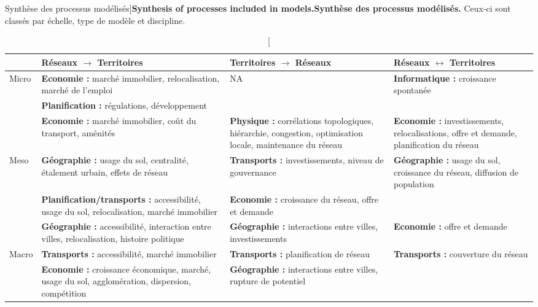 \begin{table}%
\caption[Synthesis of processes included in models][Synthèse des processus modélisés]{\textbf{Synthesis of processes included in models.}\label{tab:modelography:processes}}{\textbf{Synthèse des processus modélisés.} Ceux-ci sont classés par échelle, type de modèle et discipline. \label{tab:modelography:processes}}
\begin{tabular}{|l|p{5cm}|p{5cm}|p{5cm}|}
\hline
 & Réseaux $\rightarrow$ Territoires & Territoires $\rightarrow$ Réseaux & Réseaux $\leftrightarrow$ Territoires\\ \hline
\multirow{2}{*}{Micro} &
\textbf{Economie : } marché immobilier, relocalisation, marché de l'emploi & NA & \textbf{Informatique : } croissance spontanée \\\cline{2-2}
& \textbf{Planification : } régulations, développement & & \\\hline
& \textbf{Economie : } marché immobilier, coût du transport, aménités & \textbf{Physique : } corrélations topologiques, hiérarchie, congestion, optimisation locale, maintenance du réseau & \textbf{Economie : } investissements, relocalisations, offre et demande, planification du réseau\\\cline{2-4}
\multirow{2}{*}{Meso}& \textbf{Géographie : } usage du sol, centralité, étalement urbain, effets de réseau & \textbf{Transports : } investissements, niveau de gouvernance & \textbf{Géographie : } usage du sol, croissance du réseau, diffusion de population \\\cline{2-3}
& \textbf{Planification/transports : } accessibilité, usage du sol, relocalisation, marché immobilier & \textbf{Economie : } croissance du réseau, offre et demande & \\\hline
& \textbf{Géographie : } accessibilité, interaction entre villes, relocalisation, histoire politique  & \textbf{Géographie : } interactions entre villes, investissements & \textbf{Economie : } offre et demande \\ \cline{2-4}
\multirow{2}{*}{Macro} & \textbf{Transports : } accessibilité, marché immobilier & \textbf{Transports : } planification de réseau & \textbf{Transports : } couverture du réseau \\\cline{2-3}
& \textbf{Economie : } croissance économique, marché, usage du sol, agglomération, dispersion, compétition & \textbf{Géographie : } interactions entre villes, rupture de potentiel & \\\hline
\end{tabular}
\end{table}

